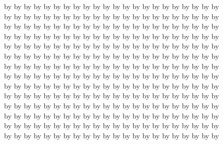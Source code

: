 by by by by by by by by by by by by by by by by by by by by by by\\
by by by by by by by by by by by by by by by by by by by by by by\\
by by by by by by by by by by by by by by by by by by by by by by\\
by by by by by by by by by by by by by by by by by by by by by by\\
by by by by by by by by by by by by by by by by by by by by by by\\
by by by by by by by by by by by by by by by by by by by by by by\\
by by by by by by by by by by by by by by by by by by by by by by\\
by by by by by by by by by by by by by by by by by by by by by by\\
by by by by by by by by by by by by by by by by by by by by by by\\
by by by by by by by by by by by by by by by by by by by by by by\\
by by by by by by by by by by by by by by by by by by by by by by\\
by by by by by by by by by by by by by by by by by by by by by by\\
by by by by by by by by by by by by by by by by by by by by by by\\
by by by by by by by by by by by by by by by by by by by by by by\\


